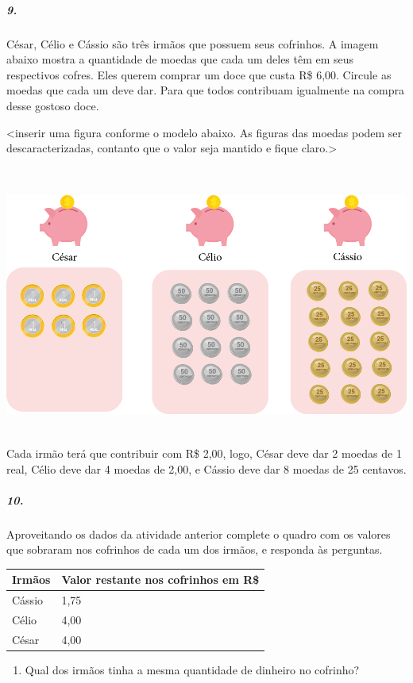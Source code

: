 \subparagraph{9.}\label{section-63}

César, Célio e Cássio são três irmãos que possuem seus cofrinhos. A
imagem abaixo mostra a quantidade de moedas que cada um deles têm em
seus respectivos cofres. Eles querem comprar um doce que custa R\$ 6,00.
Circule as moedas que cada um deve dar. Para que todos contribuam
igualmente na compra desse gostoso doce.

\textless{}inserir uma figura conforme o modelo abaixo. As figuras das
moedas podem ser descaracterizadas, contanto que o valor seja mantido e
fique claro.\textgreater{}

\includegraphics[width=6.14583in,height=3.61068in]{media/image76.png}
Cada irmão terá que contribuir com R\$ 2,00, logo, César deve dar 2
moedas de 1 real, Célio deve dar 4 moedas de 2,00, e Cássio deve dar 8
moedas de 25 centavos.

\subparagraph{10.}\label{section-64}

Aproveitando os dados da atividade anterior complete o quadro com os
valores que sobraram nos cofrinhos de cada um dos irmãos, e responda às
perguntas.

\begin{longtable}[]{@{}ll@{}}
\toprule
Irmãos & Valor restante nos cofrinhos em R\$\tabularnewline
\midrule
\endhead
Cássio & 1,75\tabularnewline
Célio & 4,00\tabularnewline
César & 4,00\tabularnewline
\bottomrule
\end{longtable}

\begin{enumerate}
\def\labelenumi{\alph{enumi})}
\item
  Qual dos irmãos tinha a mesma quantidade de dinheiro no cofrinho?
\end{enumerate}

